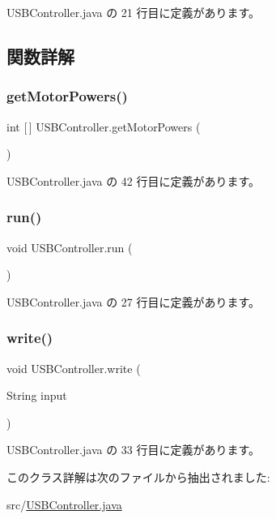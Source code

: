  U\+S\+B\+Controller.\+java の 21 行目に定義があります。



\subsection{関数詳解}
\mbox{\label{class_u_s_b_controller_abd4b47f1e86159dfd7ab01ad28f21b40}} 
\subsubsection{\texorpdfstring{getMotorPowers()}{getMotorPowers()}}
{\footnotesize\ttfamily int \mbox{[}$\,$\mbox{]} U\+S\+B\+Controller.\+get\+Motor\+Powers (\begin{DoxyParamCaption}{ }\end{DoxyParamCaption})\hspace{0.3cm}{\ttfamily [inline]}}



 U\+S\+B\+Controller.\+java の 42 行目に定義があります。

\mbox{\label{class_u_s_b_controller_a3764a01faaee1b82985a787c44a4dab1}} 
\subsubsection{\texorpdfstring{run()}{run()}}
{\footnotesize\ttfamily void U\+S\+B\+Controller.\+run (\begin{DoxyParamCaption}{ }\end{DoxyParamCaption})\hspace{0.3cm}{\ttfamily [inline]}}



 U\+S\+B\+Controller.\+java の 27 行目に定義があります。

\mbox{\label{class_u_s_b_controller_afe8a9c9fdb005132410e327153c984f4}} 
\subsubsection{\texorpdfstring{write()}{write()}}
{\footnotesize\ttfamily void U\+S\+B\+Controller.\+write (\begin{DoxyParamCaption}\item[{String}]{input }\end{DoxyParamCaption})\hspace{0.3cm}{\ttfamily [inline]}}



 U\+S\+B\+Controller.\+java の 33 行目に定義があります。



このクラス詳解は次のファイルから抽出されました\+:\begin{DoxyCompactItemize}
\item 
src/\mbox{\hyperlink{_u_s_b_controller_8java}{U\+S\+B\+Controller.\+java}}\end{DoxyCompactItemize}
